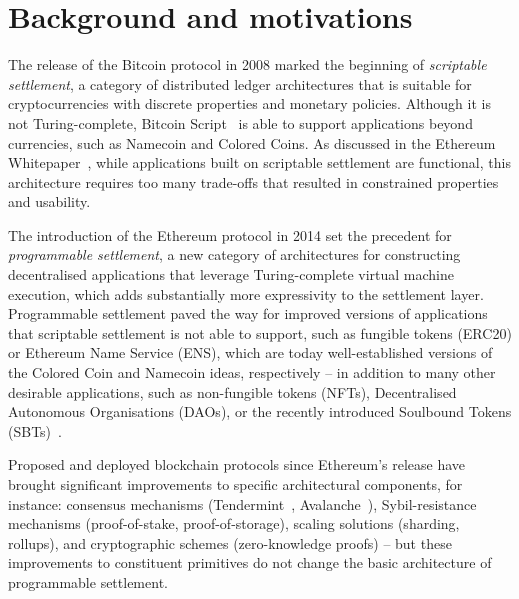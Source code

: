 \documentclass[
    9pt,            %
    commun,        %
    affiltop,       %
]{art}
\begin{document}
\maketitle

\tableofcontents

\section{Background and motivations}\label{background-and-motivations}

The release of the Bitcoin protocol in 2008 marked the beginning of
\emph{scriptable settlement}, a category of distributed ledger
architectures that is suitable for cryptocurrencies with discrete
properties and monetary policies. Although it is not Turing-complete,
Bitcoin Script~\cite{bitcoinscript} is able to support applications beyond
currencies, such as Namecoin and Colored Coins. As discussed in the
Ethereum Whitepaper~\cite{ethereumwhitepaper}, while applications built on
scriptable settlement are functional, this architecture requires too many
trade-offs that resulted in constrained properties and usability.

The introduction of the Ethereum protocol in 2014 set the precedent for
\emph{programmable settlement}, a new category of architectures for
constructing decentralised applications that leverage Turing-complete
virtual machine execution, which adds substantially more expressivity to
the settlement layer. Programmable settlement paved the way for improved
versions of applications that scriptable settlement is not able to support,
such as fungible tokens (ERC20) or Ethereum Name Service (ENS), which are
today well-established versions of the Colored Coin and Namecoin ideas,
respectively -- in addition to many other desirable applications, such as
non-fungible tokens (NFTs), Decentralised Autonomous Organisations (DAOs),
or the recently introduced Soulbound Tokens
(SBTs)~\cite{weyl2022decentralized}.

Proposed and deployed blockchain protocols since Ethereum's
release have brought significant improvements to specific architectural
components, for instance: consensus mechanisms
(Tendermint~\cite{buchman2018latest}, Avalanche~\cite{rocket2018snowflake}),
Sybil-resistance mechanisms (proof-of-stake, proof-of-storage), scaling
solutions (sharding, rollups), and cryptographic schemes (zero-knowledge
proofs) -- but these improvements to constituent primitives do not change
the basic architecture of programmable settlement.
\end{document}
